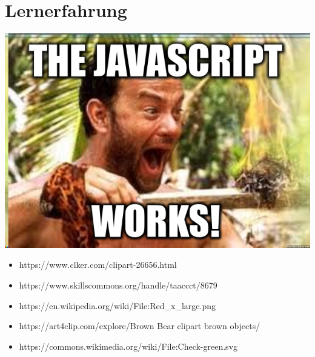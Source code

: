 \documentclass[xcolor=dvipsnames]{beamer}
\begin{document}
    \section{Lernerfahrung}
    \begin{frame}
        \begin{center}
             \includegraphics[width=(\textwidth/2)]{img/javascript.png}
        \end{center}
    \end{frame}

    \appendix
    \begin{frame}[plain]
        \begin{itemize}
            \item https://www.clker.com/clipart-26656.html \\
            \item https://www.skillscommons.org/handle/taaccct/8679 \\
            \item https://en.wikipedia.org/wiki/File:Red\_x\_large.png \\
            \item https://art4clip.com/explore/Brown Bear clipart brown objects/ \\
            \item https://commons.wikimedia.org/wiki/File:Check-green.svg \\ %
        \end{itemize}
    \end{frame}
\end{document}
